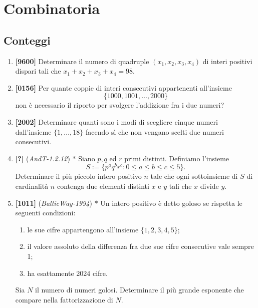 \documentclass[10pt]{article}
\begin{document}
\pagestyle{fancy}
\fancyhf{}
\fancyhead[R]{\nouppercase{\leftmark}}


\section{Combinatoria}

\subsection{Conteggi}
\begin{enumerate}
	\item \textbf{[9600]} Determinare il numero di quadruple $(x_1,x_2,x_3,x_4)$ di interi positivi dispari tali che $x_1+x_2+x_3+x_4=98$.

	\item \textbf{[0156]} Per quante coppie di interi consecutivi appartenenti all'insieme
		\begin{equation*}
			\{1000,1001,\dots,2000\}
		\end{equation*}
		non è necessario il riporto per svolgere l'addizione fra i due numeri?

	\item \textbf{[2002]} Determinare quanti sono i modi di scegliere
		cinque numeri dall'insieme $\{1,...,18 \}$ facendo sì che non
		vengano scelti due numeri consecutivi.

	\item \textbf{[?]} (\textit{AndT-1.2.12}) $\ast$ Siano $p,q$ ed $r$ primi distinti. Definiamo l'insieme
		\begin{equation*}
			S:=\{p^a q^b r^c : 0\le a \le b \le c \le 5\}.
		\end{equation*}
		Determinare il più piccolo intero positivo $n$ tale che ogni sottoinsieme di $S$ di cardinalità $n$ contenga due elementi distinti $x$ e $y$ tali che $x$ divide $y$.

	\item \textbf{[1011]} (\textit{BalticWay-1994}) $\ast$ Un intero positivo è detto goloso se rispetta le seguenti condizioni:
		\begin{enumerate}
			\item le sue cifre appartengono all'insieme $\{ 1,2,3,4,5 \}$;
			\item il valore assoluto della differenza fra due sue cifre consecutive vale sempre 1;
			\item ha esattamente 2024 cifre.
		\end{enumerate}
		Sia $N$ il numero di numeri golosi. Determinare il più grande esponente che compare nella fattorizzazione di $N$.

\end{enumerate}
\end{document}
